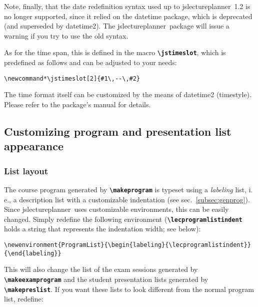 \documentclass[english]{article}
\newcommand*\jmacro[1]{\textbf{\texttt{#1}}}
\newcommand*\jcsmacro[1]{\jmacro{\textbackslash{#1}}}
\newcommand*\jslp{\textsf{jslectureplanner}}
\begin{document}
Note, finally, that the date redefinition syntax used up to \jslp\ 1.2 is no longer supported, since it relied on the \textsf{datetime} package, which is deprecated (and superseded by \textsf{datetime2}). The \jslp\ package will issue a warning if you try to use the old syntax.

As for the time span, this is defined in the macro \jcsmacro{jstimeslot}, which is predefined as follows and can be adjusted to your needs:
\begin{lstlisting}[language={[LaTeX]TeX},basicstyle={\small\ttfamily},frame=single,moretexcs={[1]{jstimeslot}}]
\newcommand*\jstimeslot[2]{#1\,--\,#2}
\end{lstlisting}
The time format itself can be customized by the means of \textsf{datetime2} (timestyle). Please refer to the package's manual for details.


\subsection{Customizing program and presentation list appearance}\label{sec:listcust}

\subsubsection{List layout}
The course program generated by \jcsmacro{makeprogram} is typeset using
a \textit{labeling} list, i.\,e., a description list
with a customizable indentation (see sec.~\ref{subsec:genprog}).
Since \jslp\ uses customizable environments, this can be easily changed.
Simply redefine the following environment (\jcsmacro{lecprogramlistindent}
holds a string that represents the indentation width; see below):

\begin{lstlisting}[language={[LaTeX]TeX},basicstyle={\small\ttfamily},
frame=single,moretexcs={[1]{lecprogramlistindent}}]
\newenvironment{ProgramList}{\begin{labeling}{\lecprogramlistindent}}{\end{labeling}}
\end{lstlisting}
%
This will also change the list of the exam sessions generated by \jcsmacro{makeexamprogram}
and the student presentation lists generated by \jcsmacro{makepreslist}.
If you want these lists to look different from the normal program list, redefine:
\end{document}

